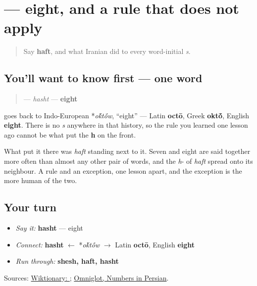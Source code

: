 \section[\texorpdfstring{\fa{هشت} (hasht)}{هشت (hasht)}]{ — eight, and a rule that does not apply}

\label{lesson:FA-C17-hasht}



\begin{quote}
Say \textbf{haft}, and what Iranian did to every word-initial \emph{s}.
\end{quote}

\subsection*{You'll want to know first — one word}
\begin{quote}
\textbf{} — \emph{hasht} — \textbf{eight}
\end{quote}

\begin{cousinweb}
\textbf{} goes back to Indo-European *\emph{o\'{k}t\'{\={o}}w}, \textquotedblleft{}eight\textquotedblright{} — Latin \textbf{octō}, Greek \textbf{okt\'{\={o}}}, English \textbf{eight}. There is no \emph{s} anywhere in that history, so the rule you learned one lesson ago cannot be what put the \textbf{h} on the front.

What put it there was \emph{haft} standing next to it. Seven and eight are said together more often than almost any other pair of words, and the \emph{h}- of \emph{haft} spread onto its neighbour. A rule and an exception, one lesson apart, and the exception is the more human of the two.
\end{cousinweb}

\subsection*{Your turn}
\begin{itemize}
\raggedright
  \item \emph{Say it:} \textbf{hasht} — eight
  \item \emph{Connect:} \textbf{hasht} $\leftarrow$ *\emph{o\'{k}t\'{\={o}}w} $\to$ Latin \textbf{octō}, English \textbf{eight}
  \item \emph{Run through:} \textbf{shesh, haft, hasht}
\end{itemize}

\begin{tcolorbox}[breakable,colback=teal!4,colframe=teal!35!black,title={Before you move on}]
Sources: \href{https://en.wiktionary.org/wiki/\%D9\%87\%D8\%B4\%D8\%AA}{Wiktionary: }; \href{https://www.omniglot.com/language/numbers/persian.htm}{Omniglot, Numbers in Persian}.
\end{tcolorbox}
